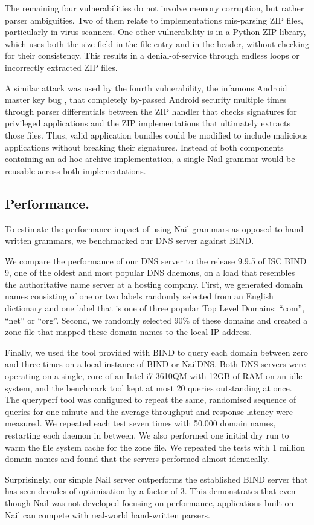 The remaining four vulnerabilities do not involve memory corruption, but rather parser ambiguities.
Two of them relate to implementations mis-parsing ZIP files, particularly in virus scanners. One
other vulnerability is in a Python ZIP library, which uses both the size field in the file entry and
in the header, without checking for their consistency. This results in a denial-of-service through
endless loops or incorrectly extracted ZIP files.

A similar attack was used by the fourth vulnerability, the infamous Android master key bug
\cite{saurik-masterkey}, that completely by-passed Android security multiple times through parser
differentials between the ZIP handler that checks signatures for privileged applications and the ZIP
implementations that ultimately extracts those files. Thus, valid  application bundles could be
modified to include malicious applications without breaking their signatures. Instead of both
components containing an ad-hoc archive implementation, a single Nail grammar would be reusable
across both implementations. 

\subsection{Performance.}

To estimate the performance impact of using Nail grammars as opposed to hand-written grammars, we
benchmarked our DNS server against BIND.

We compare the performance of our DNS server to the release 9.9.5 of ISC BIND 9\cite{bind8}, one of
the oldest and most popular DNS daemons, on a load that resembles the authoritative name server at a
hosting company. First, we generated domain names consisting of one or
two labels randomly selected from an English dictionary and one label that is one of three popular
Top Level Domains: ``com'', ``net'' or ``org''. Second, we randomly selected 90\% of these domains and
created a zone file that mapped these domain names to the local IP address. 

Finally, we used the  tool provided with BIND to query each domain between zero
and three times on a local instance of BIND or NailDNS. Both DNS servers were operating on a single, 
core  of an Intel i7-3610QM with 12GB of RAM on an idle system, and the benchmark tool kept at most 20
queries outstanding at once. The queryperf tool was configured to
repeat the same, randomised sequence of queries for one minute and the average throughput and
response latency were measured.  We repeated each test seven times  with 50.000
domain names, restarting each daemon in between. We also performed one initial dry run to warm the
file system cache for the zone file. We repeated the tests with 1 million domain names and found
that the servers performed almost identically.

Surprisingly, our simple Nail server outperforms the established BIND server that has seen decades
of optimisation by a factor of 3.  This demonstrates that even though Nail was
not developed focusing on performance, applications built on Nail can compete with real-world
hand-written parsers.



